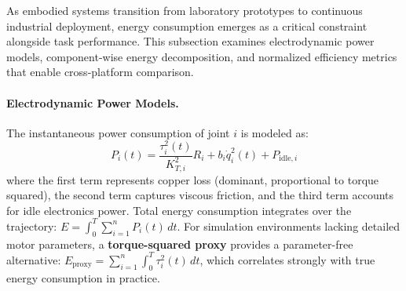 \documentclass[acmsmall,screen,review,anonymous]{acmart}
\begin{document}
As embodied systems transition from laboratory prototypes to continuous industrial deployment, energy consumption emerges as a critical constraint alongside task performance. This subsection examines electrodynamic power models, component-wise energy decomposition, and normalized efficiency metrics that enable cross-platform comparison.

\paragraph{Electrodynamic Power Models.}
The instantaneous power consumption of joint $i$ is modeled as:
\begin{equation}
  P_i(t) = \frac{\tau_i^2(t)}{K_{T,i}^2} R_i + b_i \dot{q}_i^2(t) + P_{\text{idle},i}
\end{equation}
where the first term represents copper loss (dominant, proportional to torque squared), the second term captures viscous friction, and the third term accounts for idle electronics power. Total energy consumption integrates over the trajectory: $E = \int_0^T \sum_{i=1}^{n} P_i(t)\, dt$. For simulation environments lacking detailed motor parameters, a \textbf{torque-squared proxy} provides a parameter-free alternative: $E_{\text{proxy}} = \sum_{i=1}^{n} \int_0^T \tau_i^2(t)\, dt$, which correlates strongly with true energy consumption in practice.
\end{document}

